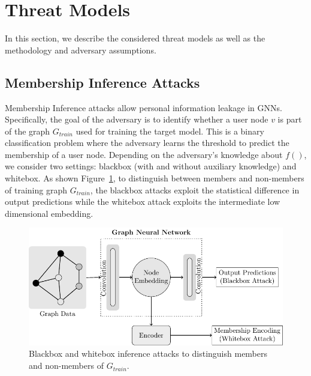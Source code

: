 \section{Threat Models}
\label{attack}

In this section, we describe the considered threat models as well as the methodology and adversary assumptions.


\subsection{Membership Inference Attacks}

Membership Inference attacks allow personal information leakage in GNNs.
Specifically, the goal of the adversary is to identify whether a user node $v$ is part of the graph $G_{train}$ used for training the target model.
This is a binary classification problem where the adversary learns the threshold to predict the membership of a user node.
Depending on the adversary's knowledge about $f()$, we consider two settings: blackbox (with and without auxiliary knowledge) and whitebox. %
As shown Figure~\ref{mia}, to distinguish between members and non-members of training graph $G_{train}$, the blackbox attacks exploit the statistical difference in output predictions while the whitebox attack exploits the intermediate low dimensional embedding.


\begin{figure}[!htb]
\centering
\includegraphics[width=0.85\linewidth]{./figures/Attacks/MIA.pdf}
\caption{Blackbox and whitebox inference attacks to distinguish members and non-members of $G_{train}$.}
\label{mia}
\vspace{-2mm}
\end{figure}


